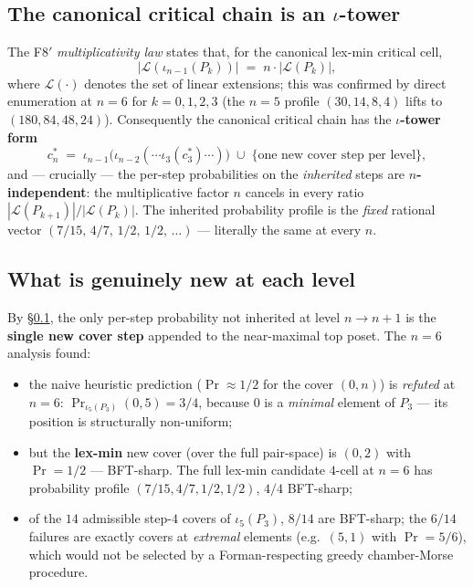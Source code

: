 \documentclass[11pt,reqno]{amsart}
\theoremstyle{plain}
\theoremstyle{definition}
\newcommand{\cstar}[1]{c^{*}_{#1}}
\begin{document}
\subsection{The canonical critical chain is an $\iota$-tower}\label{ssec:5.2}
The F8$'$ \emph{multiplicativity law} states that, for the canonical
lex-min critical cell,
\[
  |\mathcal L(\iota_{n-1}(P_k))|\;=\;n\cdot|\mathcal L(P_k)|,
\]
where $\mathcal L(\cdot)$ denotes the set of linear extensions; this was
confirmed by direct enumeration at $n=6$ for $k=0,1,2,3$ (the $n=5$
profile $(30,14,8,4)$ lifts to $(180,84,48,24)$). Consequently the
canonical critical chain has the \textbf{$\iota$-tower form}
\[
  \cstar n\;=\;\iota_{n-1}\bigl(\iota_{n-2}(\cdots\iota_3(\cstar3)\cdots)\bigr)
              \;\cup\;\{\text{one new cover step per level}\},
\]
and --- crucially --- the per-step probabilities on the \emph{inherited}
steps are \textbf{$n$-independent}: the multiplicative factor $n$
cancels in every ratio $|\mathcal L(P_{k+1})|/|\mathcal L(P_k)|$. The
inherited probability profile is the \emph{fixed} rational vector
$(7/15,\,4/7,\,1/2,\,1/2,\,\dots)$ --- literally the same at every $n$.

\subsection{What is genuinely new at each level}\label{ssec:5.3}
By \S\ref{ssec:5.2}, the only per-step probability not inherited at
level $n\to n+1$ is the \textbf{single new cover step} appended to the
near-maximal top poset. The $n=6$ analysis found:
\begin{itemize}[leftmargin=1.6em]
  \item the naive heuristic prediction ($\Pr\approx1/2$ for the cover
        $(0,n)$) is \emph{refuted} at $n=6$:
        $\Pr_{\iota_5(P_3)}(0,5)=3/4$, because $0$ is a \emph{minimal}
        element of $P_3$ --- its position is structurally
        non-uniform;
  \item but the \textbf{lex-min} new cover (over the full pair-space) is
        $(0,2)$ with $\Pr=1/2$ --- BFT-sharp. The full lex-min candidate
        $4$-cell at $n=6$ has probability profile $(7/15,4/7,1/2,1/2)$,
        $4/4$ BFT-sharp;
  \item of the $14$ admissible step-$4$ covers of $\iota_5(P_3)$,
        $8/14$ are BFT-sharp; the $6/14$ failures are exactly covers at
        \emph{extremal} elements (e.g.\ $(5,1)$ with $\Pr=5/6$), which
        would not be selected by a Forman-respecting greedy chamber-Morse
        procedure.
\end{itemize}
\end{document}
